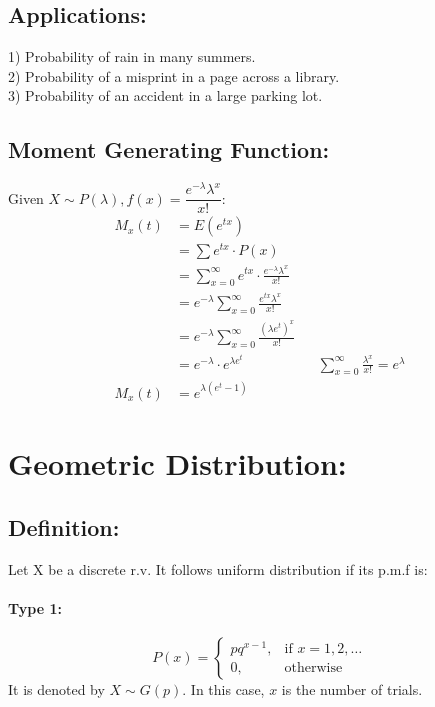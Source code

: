 \documentclass[
10pt, %
a4paper, %
]{report}
\begin{document}
\subsection*{Applications:}
1) Probability of rain in many summers. \\
2) Probability of a misprint in a page across a library. \\
3) Probability of an accident in a large parking lot.

\subsection*{Moment Generating Function:}
Given \(X \sim P(\lambda), f(x)=\dfrac{e^{-\lambda} \lambda^x}{x!}:\)
\begin{align*}
    M_x(t) &= E(e^{tx}) \\
           &= \sum e^{tx} \cdot P(x) \\
           &= \sum_{x=0}^\infty e^{tx} \cdot \frac{e^{-\lambda} \lambda^x}{x!} \\
           &= e^{-\lambda} \sum_{x=0}^\infty \frac{e^{tx} \lambda^x}{x!} \\
           &= e^{-\lambda} \sum_{x=0}^\infty \frac{(\lambda e^t)^x}{x!} \\
           &= e^{-\lambda} \cdot e^{\lambda e^t} && {\sum_{x=0}^\infty \frac{\lambda^x}{x!} = e^\lambda} \\
    M_x(t) &= e^{\lambda(e^t-1)}
\end{align*}

\newpage
\section*{Geometric Distribution:}
\subsection*{Definition:}
Let X be a discrete r.v. It follows uniform distribution if its p.m.f is:
\paragraph{Type 1:}
\[
    P(x)= 
\begin{cases}
    p q^{x-1},    & \text{if } x = 1, 2, \dots\\
    0,              & \text{otherwise}
\end{cases}
\]
It is denoted by \(X \sim G(p).\) In this case, \(x\) is the number of trials.\\
\end{document}
